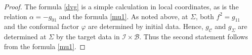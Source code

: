 \documentclass[10pt,a4paper]{amsart}
\newcommand{\Si}{\Sigma}
\renewcommand{\a}{\alpha}
\newcommand{\cB}{{\mathcal B}}
\newcommand{\cC}{{\mathcal C}}
\newcommand{\cI}{\mathcal I}
\newcommand{\f}{\varphi}
\begin{document}
\begin{proof}
The formula \eqref{dvg} is a simple calculation in local coordinates, as is the relation $\a = -g_{01}$ and the formula \eqref{mu1}. As noted above, 
at $\Si$, both $f^2 = g_{11}$ and the conformal factor $\f$ are determined by initial data. Hence, $g_{\cC}$ and $g_{\Si}$ are determined at 
$\Si$ by the target data in $\cI \times \cB$. Thus the second statement follows from the formula \eqref{mu1}. 
\end{proof}
\end{document}
